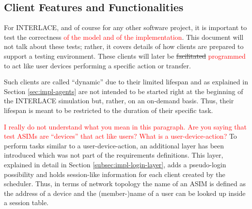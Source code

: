 \subsection{Client Features and Functionalities}
\label{subsec:impl-client-features}

For INTERLACE, and of course for any other software project, it is important to test the correctness \textcolor{red}{of the model and of the implementation}. This document will not talk about these tests; rather, it covers details of how clients are prepared to support a testing environment. These clients will later be \st{facilitated} \textcolor{red}{programmed} to act like user devices performing a specific action or transfer.

Such clients are called ``dynamic'' due to their limited lifespan and as explained in Section \ref{sec:impl-agents} are not intended to be started right at the beginning of the INTERLACE simulation but, rather, on an on-demand basis. Thus, their lifespan is meant to be restricted to the duration of their specific task.

\textcolor{red}{I really do not understand what you mean in this paragraph. Are you saying that test ASIMs are ``devices'' that act like users? What is a user-device-action?}
To perform tasks similar to a user-device-action, an additional layer has been introduced which was not part of the requirements definitions. This layer, explained in detail in Section \ref{subsec:impl-login-layer}, adds a pseudo-login possibility and holds session-like information for each client created by the scheduler. Thus, in terms of network topology the name of an ASIM is defined as the address of a device and the (member-)name of a user can be looked up inside a session table.

